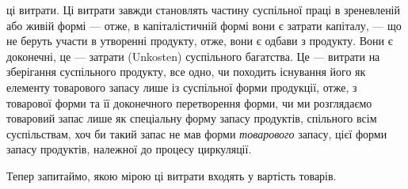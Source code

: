 \parcont{}  %
ці витрати. Ці витрати завжди становлять частину суспільної праці в зреневленій
або живій формі — отже, в капіталістичній формі вони є затрати
капіталу, — що не беруть участи в утворенні продукту, отже, вони є одбави
з продукту. Вони є доконечні, це — затрати (Unkosten) суспільного
багатства. Це — витрати на зберігання суспільного продукту, все одно,
чи походить існування його як елементу товарового запасу лише
із суспільної форми продукції, отже, з товарової форми та її доконечного
перетворення форми, чи ми розглядаємо товаровий запас лише як спеціальну
форму запасу продуктів, спільного всім суспільствам, хоч би
такий запас не мав форми \emph{товарового} запасу, цієї форми запасу продуктів,
належної до процесу циркуляції.

Тепер запитаймо, якою мірою ці витрати входять у вартість товарів.

